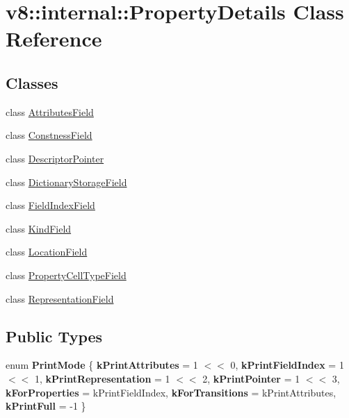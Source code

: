 \hypertarget{classv8_1_1internal_1_1PropertyDetails}{}\section{v8\+:\+:internal\+:\+:Property\+Details Class Reference}
\label{classv8_1_1internal_1_1PropertyDetails}
\subsection*{Classes}
\begin{DoxyCompactItemize}
\item 
class \mbox{\hyperlink{classv8_1_1internal_1_1PropertyDetails_1_1AttributesField}{Attributes\+Field}}
\item 
class \mbox{\hyperlink{classv8_1_1internal_1_1PropertyDetails_1_1ConstnessField}{Constness\+Field}}
\item 
class \mbox{\hyperlink{classv8_1_1internal_1_1PropertyDetails_1_1DescriptorPointer}{Descriptor\+Pointer}}
\item 
class \mbox{\hyperlink{classv8_1_1internal_1_1PropertyDetails_1_1DictionaryStorageField}{Dictionary\+Storage\+Field}}
\item 
class \mbox{\hyperlink{classv8_1_1internal_1_1PropertyDetails_1_1FieldIndexField}{Field\+Index\+Field}}
\item 
class \mbox{\hyperlink{classv8_1_1internal_1_1PropertyDetails_1_1KindField}{Kind\+Field}}
\item 
class \mbox{\hyperlink{classv8_1_1internal_1_1PropertyDetails_1_1LocationField}{Location\+Field}}
\item 
class \mbox{\hyperlink{classv8_1_1internal_1_1PropertyDetails_1_1PropertyCellTypeField}{Property\+Cell\+Type\+Field}}
\item 
class \mbox{\hyperlink{classv8_1_1internal_1_1PropertyDetails_1_1RepresentationField}{Representation\+Field}}
\end{DoxyCompactItemize}
\subsection*{Public Types}
\begin{DoxyCompactItemize}
\item 
\mbox{\label{classv8_1_1internal_1_1PropertyDetails_ab827432c274fec7564d738f6aa951f19}} 
enum {\bfseries Print\+Mode} \{ \newline
{\bfseries k\+Print\+Attributes} = 1 $<$$<$ 0, 
{\bfseries k\+Print\+Field\+Index} = 1 $<$$<$ 1, 
{\bfseries k\+Print\+Representation} = 1 $<$$<$ 2, 
{\bfseries k\+Print\+Pointer} = 1 $<$$<$ 3, 
\newline
{\bfseries k\+For\+Properties} = k\+Print\+Field\+Index, 
{\bfseries k\+For\+Transitions} = k\+Print\+Attributes, 
{\bfseries k\+Print\+Full} = -\/1
 \}
\end{DoxyCompactItemize}
